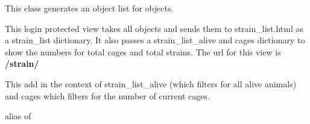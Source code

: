 \documentclass[letterpaper,10pt,english]{sphinxmanual}
\begin{document}

\begin{fulllineitems}
\label{animals:mousedb.animal.views.StrainList}
This class generates an object list for {\hyperref[animals:mousedb.animal.models.Strain]{}} objects.

This login protected view takes all {\hyperref[animals:mousedb.animal.models.Strain]{}} objects and sends them to strain\_list.html as a strain\_list dictionary.  It also passes a strain\_list\_alive and cages dictionary to show the numbers for total cages and total strains.
The url for this view is \textbf{/strain/}

\begin{fulllineitems}
\label{animals:mousedb.animal.views.StrainList.get_context_data}
This add in the context of strain\_list\_alive (which filters for all alive animals) and cages which filters for the number of current cages.

\end{fulllineitems}


\begin{fulllineitems}
\label{animals:mousedb.animal.views.StrainList.model}
alias of 

\end{fulllineitems}


\end{fulllineitems}

\end{document}
